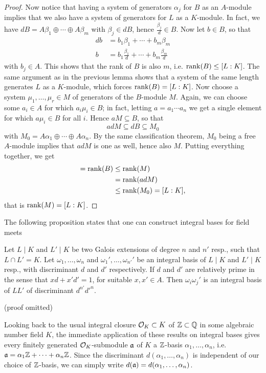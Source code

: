 \begin{proof}
	Now notice that having a system of generators $\alpha_j$ for $B$ as an $A$-module implies that we also have a system of generators for $L$ as a $K$-module. In fact, we have $dB=A\beta_1\oplus\cdots\oplus A\beta_m$ with $\beta_j\in dB$, hence $\frac{\beta_j}{d}\in B$. Now let $b\in B$, so that
	\begin{align*}
		db &= b_1\beta_1 + \cdots + b_m\beta_m\\
		b &= b_1\frac{\beta_1}{d} + \cdots + b_m\frac{\beta_m}{d}
	\end{align*}
	with $b_j\in A$. This shows that the rank of $B$ is also $m$, i.e. $\operatorname{rank}(B)\leq[L:K]$. The same argument as in the previous lemma shows that a system of the same length generates $L$ as a $K$-module, which forces $\operatorname{rank}(B)=[L:K]$. Now choose a system $\mu_1,\dots,\mu_r\in M$ of generators of the $B$-module $M$. Again, we can choose some $a_i\in A$ for which $a_i\mu_i\in B$; in fact, letting $a=a_1\cdots a_n$ we get a single element for which $a\mu_i\in B$ for all $i$. Hence $aM\subseteq B$, so that
	\[
		adM \subseteq dB \subseteq M_0
	\]
	with $M_0=A\alpha_1\oplus\cdots\oplus A\alpha_n$. By the same classification theorem, $M_0$ being a free $A$-module implies that $adM$ is one as well, hence also $M$. Putting everything together, we get
	\begin{align*}
		[L:K] = \rank(B) &\leq \rank(M)\\
			&= \rank(adM)\\
			&\leq \rank(M_0) = [L:K],
	\end{align*}
	that is $\operatorname{rank}(M)=[L:K]$.
\end{proof}

The following proposition states that one can construct integral bases for field meets 

\begin{prop}
	Let $L\mid K$ and $L'\mid K$ be two Galois extensions of degree $n$ and $n'$ resp., such that $L\cap L'=K$. Let $\omega_1,\dots,\omega_n$ and $\omega_1',\dots,\omega_{n'}'$ be an integral basis of $L\mid K$ and $L'\mid K$ resp., with discriminant $d$ and $d'$ respectively. If $d$ and $d'$ are relatively prime in the sense that $xd+x'd'=1$, for suitable $x,x'\in A$. Then $\omega_i\omega_j'$ is an integral basis of $LL'$ of discriminant $d^{n'}d'^{n}$.
\end{prop}
(proof omitted)

Looking back to the usual integral closure $\mathcal{O}_K\subset K$ of $\mathbb{Z}\subset\mathbb{Q}$ in some algebraic number field $K$, the immediate application of these results on integral bases gives every finitely generated $\mathcal{O}_K$-submodule $\mathfrak{a}$ of $K$ a $\mathbb{Z}$-basis $\alpha_1,\dots,\alpha_n$, i.e. $\mathfrak{a} = \alpha_1\mathbb{Z}+\cdots+\alpha_n\mathbb{Z}$. Since the discriminant $d(\alpha_1,\dots,\alpha_n)$ is independent of our choice of $\mathbb{Z}$-basis, we can simply write $d(\mathfrak{a})=d(\alpha_1,\dots,\alpha_n)$.

